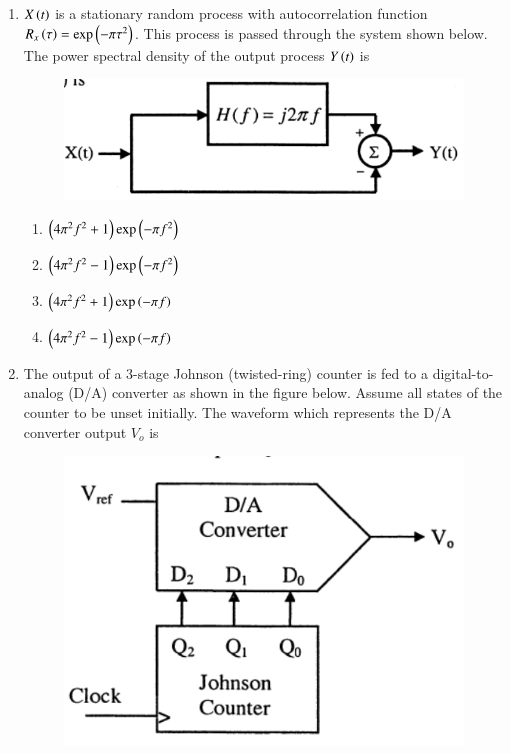 \documentclass[a4paper, 11pt]{article}
\begin{document}
\begin{enumerate}
    \hfill{}

    \item $X\left(t\right)$ is a stationary random process with autocorrelation function $R_{x}\left(\tau\right)=\exp\left(-\pi\tau^{2}\right)$. This process is passed through the system shown below. The power spectral density of the output process $Y\left(t\right)$ is
    
    \begin{figure}[H]
        \centering
        \includegraphics[width=0.7\columnwidth]{figs/q39.png}
        \caption*{}
        \label{fig:q39}
    \end{figure}
    
    \begin{enumerate}
        \item $\left(4\pi^{2}f^{2}+1\right)\exp\left(-\pi f^{2}\right)$
        \item $\left(4\pi^{2}f^{2}-1\right)\exp\left(-\pi f^{2}\right)$
        \item $\left(4\pi^{2}f^{2}+1\right)\exp\left(-\pi f\right)$
        \item $\left(4\pi^{2}f^{2}-1\right)\exp\left(-\pi f\right)$
    \end{enumerate}

    \hfill{}

    \item The output of a 3-stage Johnson (twisted-ring) counter is fed to a digital-to-analog (D/A) converter as shown in the figure below. Assume all states of the counter to be unset initially. The waveform which represents the D/A converter output $V_{o}$ is
    
    \begin{figure}[H]
        \centering
        \includegraphics[width=0.5\columnwidth]{figs/q40.png}
        \caption*{}
        \label{fig:q40}
    \end{figure}
    

\end{enumerate}
\end{document}
